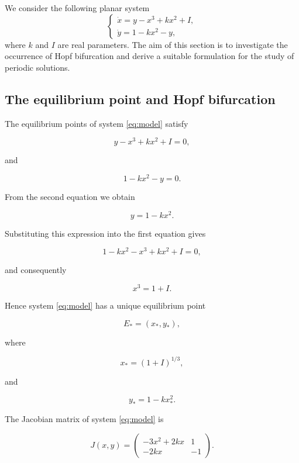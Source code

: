 \documentclass[11pt,reqno]{amsart}
\theoremstyle{plain}
\theoremstyle{definition}
\theoremstyle{remark}
\begin{document}
We consider the following planar system
\begin{equation}
\label{eq:model}
\begin{cases}
\dot{x}=y-x^3+kx^2+I,\\[1mm]
\dot{y}=1-kx^2-y,
\end{cases}
\end{equation}
where $k$ and $I$ are real parameters. The aim of this section is to
investigate the occurrence of Hopf bifurcation and derive a suitable
formulation for the study of periodic solutions.

\subsection{The equilibrium point and Hopf bifurcation}

The equilibrium points of system \eqref{eq:model} satisfy

\[
y-x^3+kx^2+I=0,
\]

and

\[
1-kx^2-y=0.
\]

From the second equation we obtain

\[
y=1-kx^2.
\]

Substituting this expression into the first equation gives

\[
1-kx^2-x^3+kx^2+I=0,
\]

and consequently

\[
x^3=1+I.
\]

Hence system \eqref{eq:model} has a unique equilibrium point

\begin{equation}
\label{eq:equilibrium}
E_*=(x_*,y_*),
\end{equation}

where

\begin{equation}
\label{eq:xstar}
x_*=(1+I)^{1/3},
\end{equation}

and

\begin{equation}
\label{eq:ystar}
y_*=1-kx_*^2 .
\end{equation}

The Jacobian matrix of system \eqref{eq:model} is

\[
J(x,y)=
\begin{pmatrix}
-3x^2+2kx&1\\
-2kx&-1
\end{pmatrix}.
\]
\end{document}
